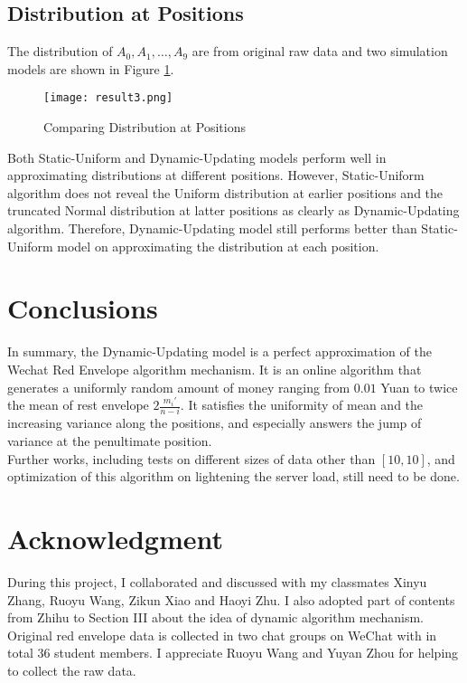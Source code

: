 \documentclass[10pt,journal]{IEEEtran}
\begin{document}
\subsection{Distribution at Positions}
The distribution of $A_0, A_1, \dots , A_9$ are from original raw data and two simulation models are shown in Figure \ref{fig:result3}.
\begin{figure}[H]
	\centering
	\texttt{[image: result3.png]}
	\caption{Comparing Distribution at Positions} \label{fig:result3}
\end{figure}
Both Static-Uniform and Dynamic-Updating models perform well in approximating distributions at different positions. However, Static-Uniform algorithm does not reveal the Uniform distribution at earlier positions and the truncated Normal distribution at latter positions as clearly as Dynamic-Updating algorithm. Therefore, Dynamic-Updating model still performs better than Static-Uniform model on approximating the distribution at each position.

\section{Conclusions}
In summary, the Dynamic-Updating model is a perfect approximation of the Wechat Red Envelope algorithm mechanism. It is an online algorithm that generates a uniformly random amount of money ranging from $0.01$ Yuan to twice the mean of rest envelope $2\frac{m_i'}{n-i}$. It satisfies the uniformity of mean and the increasing variance along the positions, and especially answers the jump of variance at the penultimate position.\\

Further works, including tests on different sizes of data other than $[10, 10]$, and optimization of this algorithm on lightening the server load, still need to be done.

\section*{Acknowledgment}
During this project, I collaborated and discussed with my classmates Xinyu Zhang, Ruoyu Wang, Zikun Xiao and Haoyi Zhu. I also adopted part of contents from Zhihu \cite{Zhihu1} \cite{Zhihu2} to Section III about the idea of dynamic algorithm mechanism. Original red envelope data is collected in two chat groups on WeChat with in total 36 student members. I appreciate Ruoyu Wang and Yuyan Zhou for helping to collect the raw data.



\end{document}
